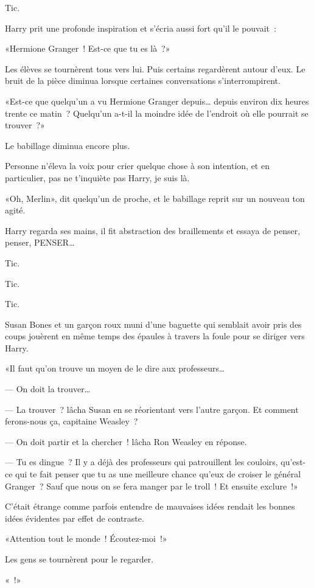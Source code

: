 Tic.

Harry prit une profonde inspiration et s'écria aussi fort qu'il le pouvait~:

«Hermione Granger~! Est-ce que tu es là~?»

Les élèves se tournèrent tous vers lui. Puis certains regardèrent autour d'eux. Le bruit de la pièce diminua lorsque certaines conversations s'interrompirent.

«Est-ce que quelqu'un a vu Hermione Granger depuis… depuis environ dix heures trente ce matin~? Quelqu'un a-t-il la moindre idée de l'endroit où elle pourrait se trouver~?»

Le babillage diminua encore plus.

Personne n'éleva la voix pour crier quelque chose à son intention, et en particulier, pas ne t'inquiète pas Harry, je suis là.

«Oh, Merlin», dit quelqu'un de proche, et le babillage reprit sur un nouveau ton agité.

Harry regarda ses mains, il fit abstraction des braillements et essaya de penser, penser, PENSER…

Tic.

Tic.

Tic.

Susan Bones et un garçon roux muni d'une baguette qui semblait avoir pris des coups jouèrent en même temps des épaules à travers la foule pour se diriger vers Harry.

«Il faut qu'on trouve un moyen de le dire aux professeurs…

--- On doit la trouver…

--- La trouver~? lâcha Susan en se réorientant vers l'autre garçon. Et comment ferons-nous ça, capitaine Weasley~?

--- On doit partir et la chercher~! lâcha Ron Weasley en réponse.

--- Tu es dingue~? Il y a déjà des professeurs qui patrouillent les couloirs, qu'est-ce qui te fait penser que tu as une meilleure chance qu'eux de croiser le général Granger~? Sauf que nous on se fera manger par le troll~! Et ensuite exclure~!»

C'était étrange comme parfois entendre de mauvaises idées rendait les bonnes idées évidentes par effet de contraste.

«Attention tout le monde~! Écoutez-moi~!»

Les gens se tournèrent pour le regarder.

«~!»

